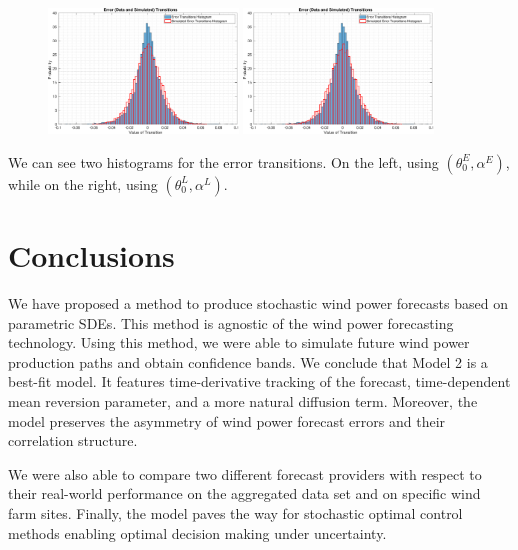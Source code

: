 \documentclass[11pt]{article}
\theoremstyle{definition}
\begin{document}
\begin{figure}[ht!]
\centering
\includegraphics[width=0.45\textwidth]{../../MATLAB_Files/Results/histograms/classic/Optimal.eps}
\includegraphics[width=0.45\textwidth]{../../MATLAB_Files/Results/histograms/classic/Lamperti_Optimal.eps}
\end{figure}

We can see two histograms for the error transitions. On the left, using $(\theta_0^E,\alpha^E)$, while on the right, using $(\theta_0^L,\alpha^L)$.


\section{Conclusions} \label{Section_7}

We have proposed a method to produce stochastic wind power forecasts based on parametric SDEs. This method is agnostic of the wind power forecasting technology. Using this method, we were able to simulate future wind power production paths and obtain confidence bands. We conclude that Model 2 is a best-fit model. It features time-derivative tracking of the forecast, time-dependent mean reversion parameter, and a more natural diffusion term. Moreover, the model preserves the asymmetry of wind power forecast errors and their correlation structure.

We were also able to compare two different forecast providers with respect to their real-world performance on the aggregated data set and on specific wind farm sites. Finally, the model paves the way for stochastic optimal control methods enabling optimal decision making under uncertainty.
\end{document}
